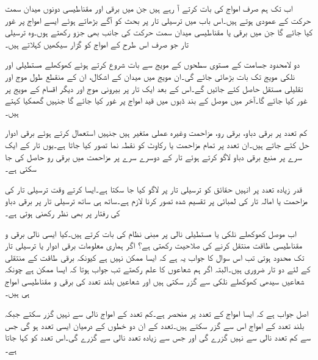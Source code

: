 اب تک ہم صرف    امواج کی بات کرتے آ رہے ہیں جن میں برقی اور مقناطیسی دونوں میدان سمت حرکت کے عمودی ہوتے ہیں۔اس باب میں ترسیلی تار پر بحث کو آگے بڑھاتے ہوئے ایسے امواج پر غور کیا جائے گا جن میں برقی یا مقناطیسی میدان سمت حرکت کی جانب بھی جزو رکھتے ہوں۔وہ ترسیلی تار جو صرف اس طرح کے امواج کو گزار سیکھیں  کہلاتے ہیں۔

دو لامحدود جسامت کے مستوی سطحوں کے مویج سے بات شروع کرتے ہوئے کھوکھلے مستطیلی اور نلکی مویج تک بات بڑھائی جائے گی۔ان مویج میں میدان کے اشکال، ان کے منقطع طول موج اور تقلیلی مستقل  حاصل کئے جائیں گے۔اس کے بعد ایک تار پر بیرونی موج اور دیگر اقسام کے مویج پر غور کیا جائے گا۔آخر میں موصل کے بند ڈبوں میں قید امواج پر غور کیا جائے گا جنہیں گھمکیا کہتے ہیں۔

کم تعدد پر برقی دباو، برقی رو، مزاحمت وغیرہ عملی متغیر ہیں جنہیں استعمال کرتے ہوئے برقی ادوار حل کئے جاتے ہیں۔ان تعدد پر تمام مزاحمت یا رکاوٹ کو نقطہ نما تصور کیا جاتا ہے۔یوں تار کے ایک سرے پر منبع برقی دباو لاگو کرتے ہوئے تار کے دوسرے سرے پر مزاحمت میں برقی رو حاصل کی جا سکتی ہے۔

قدر زیادہ تعدد پر انہیں حقائق کو ترسیلی تار پر لاگو کیا جا سکتا ہے۔ایسا کرتے وقت ترسیلی تار کی مزاحمت یا امالہ تار کی لمبائی پر تقسیم شدہ  تصور کرنا لازم ہے۔ساتھ ہی ساتھ ترسیلی تار پر برقی دباو کی رفتار پر بھی نظر رکھنی ہوتی ہے۔

اب موصل کھوکھلے نلکی یا مستطیلی نالی پر مبنی نظام کی بات کرتے ہیں۔کیا ایسی نالی برقی و مقناطیسی طاقت منتقل کرنے کی صلاحیت رکھتی ہے؟ اگر ہماری معلومات برقی ادوار یا ترسیلی تار تک محدود ہوتی تب اس سوال کا جواب یہ ہے کہ ایسا ممکن نہیں ہے کیونکہ برقی طاقت کے منتقلی کے لئے دو تار ضروری ہیں۔البتہ اگر ہم شعاعوں کا علم رکھتے تب جواب ہوتا کہ ایسا ممکن ہے چونکہ شعاعیں سیدھی کھوکھلے نلکی سے گزر سکتی ہیں اور شعاعیں بلند تعدد  کی برقی و مقناطیسی امواج ہی ہیں۔

اصل جواب ہے کہ ایسا امواج کے تعدد پر منحصر ہے۔کم تعدد کے امواج نالی سے نہیں گزر سکتے جبکہ بلند تعدد کے امواج اس سے گزر سکتے ہیں۔تعدد کے ان دو خطوں کے درمیان ایسی تعدد ہو گی جس سے کم تعدد نالی سے نہیں گزرے گی اور جس سے زیادہ تعدد نالی سے گزرے گی۔اس تعدد کو  کہا جاتا ہے۔ 

